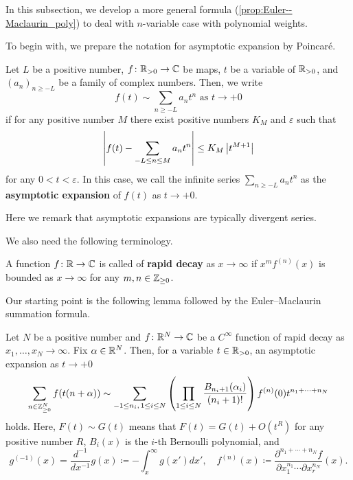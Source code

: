 \documentclass[11pt,a4paper,lualatex]{amsart}
\numberwithin{equation}{section} %
\begin{document}
In this subsection, we develop a more general formula (\cref{prop:Euler--Maclaurin_poly}) to deal with $ n $-variable case with polynomial weights.

To begin with, we prepare the notation for asymptotic expansion by Poincar\'{e}. 

\begin{dfn}[Poincar\'{e}]
	Let $ L $ be a positive number, $ f \colon \mathbb{R}_{>0} \to \mathbb{C} $ be maps, $ t $ be a variable of $ \mathbb{R}_{>0} $, and $ (a_n)_{n \ge -L} $ be a family of complex numbers.
	Then, we write
	\[
	f(t) \sim \sum_{n \ge -L} a_n t^{n} \text{ as } t \to +0
	\]
	if for any positive number $ M $ there exist positive numbers $ K_M $ and $ \varepsilon $ such that
	\[
	\left\lvert f(t) - \sum_{-L \le n \le M} a_n t^{n} \right\rvert
	\le K_M \left\lvert t^{M+1}\right\rvert
	\]
	for any $ 0 < t < \varepsilon $.
	In this case, we call the infinite series $ \sum_{n \ge -L} a_n t^{n} $ as the \textbf{asymptotic expansion} of $ f(t) $ as $ t \to +0 $. 
\end{dfn}

Here we remark that asymptotic expansions are typically divergent series.

We also need the following terminology.

\begin{dfn}
	A function $ f \colon \mathbb{R} \to \mathbb{C} $ is called of \textbf{rapid decay} as $ x \to \infty $ if $ x^m f^{(n)} (x) $ is bounded as $ x \to \infty $ for any $ m, n \in \mathbb{Z}_{\ge 0} $.
\end{dfn}

Our starting point is the following lemma followed by the Euler--Maclaurin summation formula.

\begin{lem} \label{lem:Euler--Maclaurin}
	Let $ N $ be a positive number and $ f \colon \mathbb{R}^N \to \mathbb{C} $ be a $ C^\infty $ function of rapid decay as $ x_1, \dots, x_N \to \infty $.
	Fix $ \alpha \in \mathbb{R}^N $.
	Then, for a variable $ t \in \mathbb{R}_{>0} $, an asymptotic expansion as $ t \to +0 $
	\[
	\sum_{n \in \mathbb{Z}_{\ge 0}^N} f(t(n+\alpha))
	\sim \sum_{-1 \le n_i, \, 1 \le i \le N} \left( \prod_{1 \le i \le N} \frac{B_{n_i+1}(\alpha_i)}{(n_i+1)!} \right)
	f^{(n)}(0) t^{n_1 + \cdots + n_N}
	\]
	holds.
	Here, $ F(t) \sim G(t) $ means that $ F(t) = G(t) + O(t^R) $ for any positive number $ R $,
	$ B_i(x) $ is the $ i $-th Bernoulli polynomial, and
	\[
	g^{(-1)}(x) = \frac{d^{-1}}{d x^{-1}} g(x) \coloneqq -\int_x^\infty g(x') dx', \quad
	f^{(n)}(x) \coloneqq \frac{\partial^{n_1 + \cdots + n_N} f}{\partial x_1^{n_1} \cdots \partial x_r^{n_N}} (x).
	\]
\end{lem}
\end{document}
